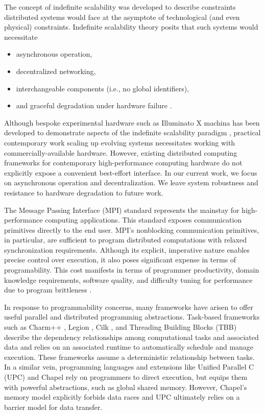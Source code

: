 The concept of indefinite scalability was developed to describe constraints distributed systems would face at the asymptote of technological (and even physical) constraints.
Indefinite scalability theory posits that such systems would necessitate
\begin{itemize}
    \item asynchronous operation,
    \item decentralized networking,
    \item interchangeable components (i.e., no global identifiers),
    \item and graceful degradation under hardware failure \cite{ackley2011pursue}.
\end{itemize}
Although bespoke experimental hardware such as Illuminato X machina has been developed to demonstrate aspects of the indefinite scalability paradigm \cite{ackley2011homeostatic}, practical contemporary work scaling up evolving systems necessitates working with commercially-available hardware.
However, existing distributed computing frameworks for contemporary high-performance computing hardware do not explicitly expose a convenient best-effort interface.
In our current work, we focus on asynchronous operation and decentralization.
We leave system robustness and resistance to hardware degradation to future work.

The Message Passing Interface (MPI) standard \cite{gropp1996high} represents the mainstay for high-performance computing applications.
This standard exposes communication primitives directly to the end user.
MPI's nonblocking communication primitives, in particular, are sufficient to program distributed computations with relaxed synchronization requirements.
Although its explicit, imperative nature enables precise control over execution, it also poses significant expense in terms of programability.
This cost manifests in terms of programmer productivity, domain knowledge requirements, software quality, and difficulty tuning for performance due to program brittleness \cite{gu2019comparative, tang2014mpi}.

In response to programmability concerns, many frameworks have arisen to offer useful parallel and distributed programming abstractions.
Task-based frameworks such as Charm++ \cite{kale1993charm++}, Legion \cite{bauer2012legion}, Cilk \cite{blumofe1996cilk}, and Threading Building Blocks (TBB) \cite{reinders2007intel} describe the dependency relationships among computational tasks and associated data and relies on an associated runtime to automatically schedule and manage execution.
These frameworks assume a deterministic relationship between tasks.
In a similar vein, programming languages and extensions like Unified Parallel C (UPC) \cite{el2006upc} and Chapel \cite{chamberlain2007parallel} rely on programmers to direct execution, but equips them with powerful abstractions, such as global shared memory.
However, Chapel's memory model explicitly forbids data races and UPC ultimately relies on a barrier model for data transfer.